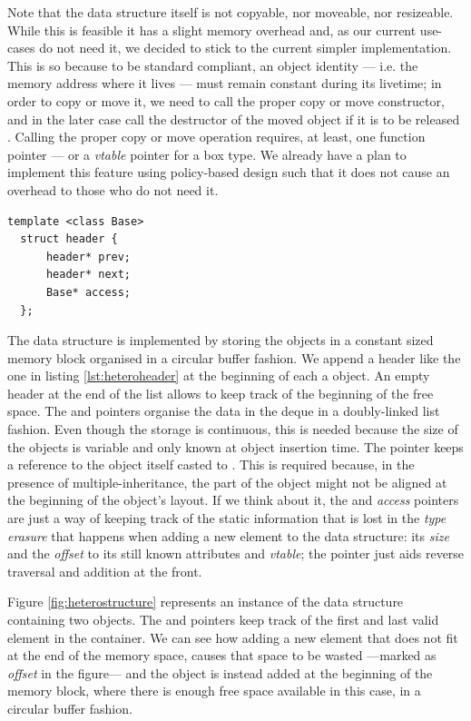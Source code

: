 Note that the data structure itself is not copyable, nor moveable, nor
resizeable. While this is feasible it has a slight memory overhead
and, as our current use-cases do not need it, we decided to stick to
the current simpler implementation. This is so because to be standard
compliant, an object identity --- i.e. the memory address where it
lives --- must remain constant during its livetime; in order to copy
or move it, we need to call the proper copy or move constructor, and
in the later case call the destructor of the moved object if it is to
be released \cite{cppstd}. Calling the proper copy or move operation
requires, at least, one function pointer --- or a \emph{vtable}
pointer for a box type. We already have a plan to implement this
feature using policy-based design \cite{alexandrescu01modern} such
that it does not cause an overhead to those who do not need it.

\begin{lstlisting}[float=h!,caption=Header of heterogeneous deque elements,label=lst:heteroheader]
  template <class Base>
  struct header {
      header* prev;
      header* next;
      Base* access;
  };
\end{lstlisting}

The data structure is implemented by storing the objects in a constant
sized memory block organised in a circular buffer fashion.  We append
a header like the one in listing \ref{lst:heteroheader} at the
beginning of each a object. An empty header at the end of the list
allows to keep track of the beginning of the free space. The
 and  pointers organise the data in the deque in
a doubly-linked list fashion. Even though the storage is continuous,
this is needed because the size of the objects is variable and only
known at object insertion time. The  pointer keeps a
reference to the object itself casted to . This is
required because, in the presence of multiple-inheritance, the
 part of the object might not be aligned at the beginning
of the object's layout. If we think about it, the  and
\emph{access} pointers are just a way of keeping track of the
static information that is lost in the \emph{type erasure}
that happens when adding a new element to the data structure: its
\emph{size} and the \emph{offset} to its still known attributes and
\emph{vtable}; the  pointer just aids reverse traversal and
addition at the front.

Figure \ref{fig:heterostructure} represents an instance of the data
structure containing two objects. The  and 
pointers keep track of the first and last valid element in the
container. We can see how adding a new element that does not fit at
the end of the memory space, causes that space to be wasted ---marked
as \emph{offset} in the figure---  and the object is instead added at
the beginning of the memory block, where there is enough free space
available in this case, in a circular buffer fashion.

